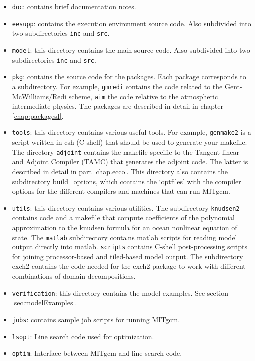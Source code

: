 \begin{itemize}

\item \texttt{doc}: contains brief documentation notes.
  
\item \texttt{eesupp}: contains the execution environment source code.
  Also subdivided into two subdirectories \texttt{inc} and
  \texttt{src}.
  
\item \texttt{model}: this directory contains the main source code.
  Also subdivided into two subdirectories \texttt{inc} and
  \texttt{src}.
  
\item \texttt{pkg}: contains the source code for the packages. Each
  package corresponds to a subdirectory. For example, \texttt{gmredi}
  contains the code related to the Gent-McWilliams/Redi scheme,
  \texttt{aim} the code relative to the atmospheric intermediate
  physics. The packages are described in detail in chapter \ref{chap:packagesI}.
  
\item \texttt{tools}: this directory contains various useful tools.
  For example, \texttt{genmake2} is a script written in csh (C-shell)
  that should be used to generate your makefile. The directory
  \texttt{adjoint} contains the makefile specific to the Tangent
  linear and Adjoint Compiler (TAMC) that generates the adjoint code.
  The latter is described in detail in part \ref{chap.ecco}.
  This directory also contains the subdirectory build\_options, which
  contains the `optfiles' with the compiler options for the different
  compilers and machines that can run MITgcm.
  
\item \texttt{utils}: this directory contains various utilities. The
  subdirectory \texttt{knudsen2} contains code and a makefile that
  compute coefficients of the polynomial approximation to the knudsen
  formula for an ocean nonlinear equation of state. The
  \texttt{matlab} subdirectory contains matlab scripts for reading
  model output directly into matlab. \texttt{scripts} contains C-shell
  post-processing scripts for joining processor-based and tiled-based
  model output. The subdirectory exch2 contains the code needed for
  the exch2 package to work with different combinations of domain
  decompositions.
  
\item \texttt{verification}: this directory contains the model
  examples. See section \ref{sec:modelExamples}.

\item \texttt{jobs}: contains sample job scripts for running MITgcm.
  
\item \texttt{lsopt}: Line search code used for optimization.
  
\item \texttt{optim}: Interface between MITgcm and line search code.
  
\end{itemize}

